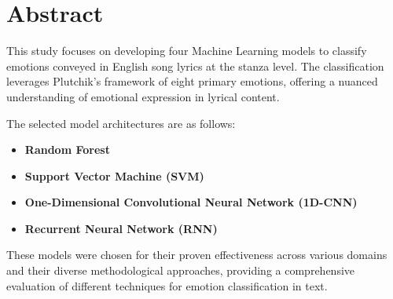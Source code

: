 \chapter*{Abstract}


This study focuses on developing four Machine Learning models to classify
emotions conveyed in English song lyrics at the stanza level. The
classification leverages Plutchik's framework of eight primary emotions,
offering a nuanced understanding of emotional expression in lyrical content.

The selected model architectures are as follows:
\begin{itemize}
    \item \textbf{Random Forest}
    \item \textbf{Support Vector Machine (SVM)}
    \item \textbf{One-Dimensional Convolutional Neural Network (1D-CNN)}
    \item \textbf{Recurrent Neural Network (RNN)}
\end{itemize}

These models were chosen for their proven effectiveness across various
domains and their diverse methodological approaches, providing a comprehensive
evaluation of different techniques for emotion classification in text.